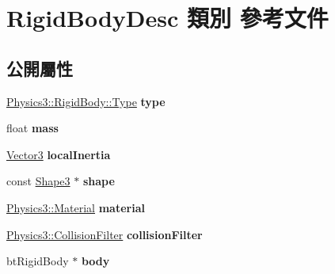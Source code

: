 \hypertarget{class_rigid_body_desc}{}\section{Rigid\+Body\+Desc 類別 參考文件}
\label{class_rigid_body_desc}
\subsection*{公開屬性}
\begin{DoxyCompactItemize}
\item 
\hyperlink{class_i_dream_sky_1_1_physics3_1_1_rigid_body_a8a970d66442558ce0a3ce7b8009c14fa}{Physics3\+::\+Rigid\+Body\+::\+Type} {\bfseries type}\hypertarget{class_rigid_body_desc_ae4744fc05ffac22873dfb82e6b652bf4}{}\label{class_rigid_body_desc_ae4744fc05ffac22873dfb82e6b652bf4}

\item 
float {\bfseries mass}\hypertarget{class_rigid_body_desc_a579678ddbe8447b2992d654da7ecba66}{}\label{class_rigid_body_desc_a579678ddbe8447b2992d654da7ecba66}

\item 
\hyperlink{class_i_dream_sky_1_1_vector3}{Vector3} {\bfseries local\+Inertia}\hypertarget{class_rigid_body_desc_a9b8ddeb5021629438cf28d0cf75e6ccb}{}\label{class_rigid_body_desc_a9b8ddeb5021629438cf28d0cf75e6ccb}

\item 
const \hyperlink{class_i_dream_sky_1_1_shape3}{Shape3} $\ast$ {\bfseries shape}\hypertarget{class_rigid_body_desc_a6f723b89e48b4c311f76dd800a33e2d7}{}\label{class_rigid_body_desc_a6f723b89e48b4c311f76dd800a33e2d7}

\item 
\hyperlink{class_i_dream_sky_1_1_physics3_1_1_material}{Physics3\+::\+Material} {\bfseries material}\hypertarget{class_rigid_body_desc_a506f84374f51c604fa3e93d17e583fda}{}\label{class_rigid_body_desc_a506f84374f51c604fa3e93d17e583fda}

\item 
\hyperlink{class_i_dream_sky_1_1_physics3_1_1_collision_filter}{Physics3\+::\+Collision\+Filter} {\bfseries collision\+Filter}\hypertarget{class_rigid_body_desc_af9c2cef683708419b398473a3cdbe101}{}\label{class_rigid_body_desc_af9c2cef683708419b398473a3cdbe101}

\item 
bt\+Rigid\+Body $\ast$ {\bfseries body}\hypertarget{class_rigid_body_desc_ab5aa53beaa9f84e68117e1686e7d0e88}{}\label{class_rigid_body_desc_ab5aa53beaa9f84e68117e1686e7d0e88}


\end{DoxyCompactItemize}
